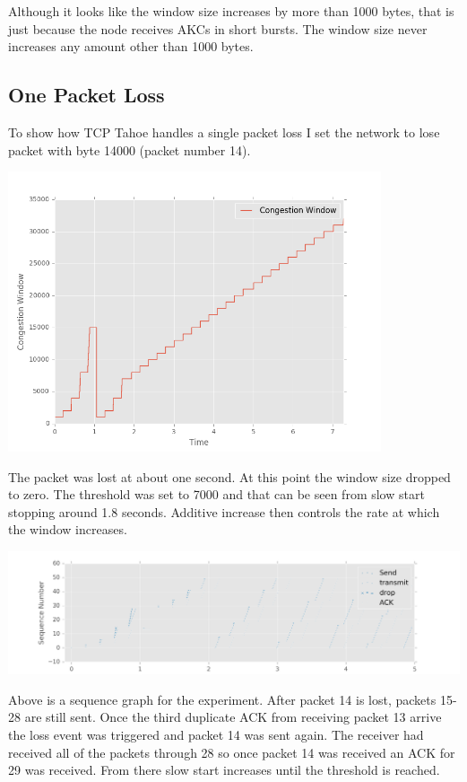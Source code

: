 \documentclass[fleqn,11pt]{article}
\begin{document}
Although it looks like the window size increases by more than 1000 bytes, that is just because the node receives AKCs in short bursts.
The window size never increases any amount other than 1000 bytes.

\subsection{One Packet Loss}

To show how TCP Tahoe handles a single packet loss I set the network to lose packet with byte 14000 (packet number 14). 

\includegraphics[width=11cm]{graphs/cwnd14.png}

The packet was lost at about one second. 
At this point the window size dropped to zero. 
The threshold was set to 7000 and that can be seen from slow start stopping around 1.8 seconds.
Additive increase then controls the rate at which the window increases.

\includegraphics[width=16cm]{graphs/sequence14.png}

Above is a sequence graph for the experiment. After packet 14 is lost, packets 15-28 are still sent.
Once the third duplicate ACK from receiving packet 13 arrive the loss event was triggered and packet 14 was sent again.
The receiver had received all of the packets through 28 so once packet 14 was received an ACK for 29 was received.
From there slow start increases until the threshold is reached. 
\end{document}

